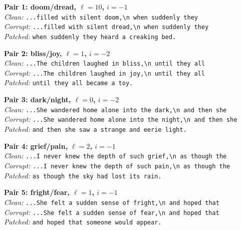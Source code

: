 \documentclass{article}
\begin{document}
{\small\raggedright
\medskip\noindent\textbf{Pair 1: doom/dread, $\ell=10$, $i=-1$}\\
\textit{Clean:} \texttt{...filled with silent doom,\textbackslash n when suddenly they}\\
\textit{Corrupt:} \texttt{...filled with silent dread,\textbackslash n when suddenly they}\\
\textit{Patched:} \texttt{when suddenly they heard a creaking bed.}

\medskip\noindent\textbf{Pair 2: bliss/joy, $\ell=1$, $i=-2$}\\
\textit{Clean:} \texttt{...The children laughed in bliss,\textbackslash n until they all}\\
\textit{Corrupt:} \texttt{...The children laughed in joy,\textbackslash n until they all}\\
\textit{Patched:} \texttt{until they all became a toy.}

\medskip\noindent\textbf{Pair 3: dark/night, $\ell=0$, $i=-2$}\\
\textit{Clean:} \texttt{...She wandered home alone into the dark,\textbackslash n and then she}\\
\textit{Corrupt:} \texttt{...She wandered home alone into the night,\textbackslash n and then she}\\
\textit{Patched:} \texttt{and then she saw a strange and eerie light.}

\medskip\noindent\textbf{Pair 4: grief/pain, $\ell=2$, $i=-1$}\\
\textit{Clean:} \texttt{...I never knew the depth of such grief,\textbackslash n as though the}\\
\textit{Corrupt:} \texttt{...I never knew the depth of such pain,\textbackslash n as though the}\\
\textit{Patched:} \texttt{as though the sky had lost its rain.}

\medskip\noindent\textbf{Pair 5: fright/fear, $\ell=1$, $i=-1$}\\
\textit{Clean:} \texttt{...She felt a sudden sense of fright,\textbackslash n and hoped that}\\
\textit{Corrupt:} \texttt{...She felt a sudden sense of fear,\textbackslash n and hoped that}\\
\textit{Patched:} \texttt{and hoped that someone would appear.}
}
\end{document}
